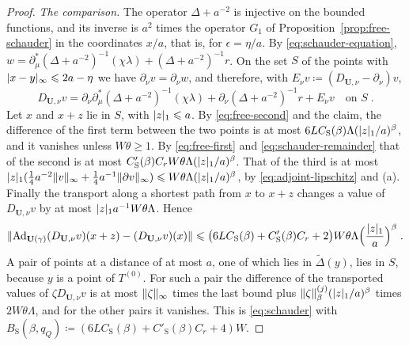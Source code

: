 \documentclass[11pt]{preprint}
\newcommand{\Ad}{\operatorname{Ad}}
\DeclarePairedDelimiter{\abs}{\lvert}{\rvert}
\DeclarePairedDelimiter{\norm}{\lVert}{\rVert}
\numberwithin{equation}{section}
\begin{document}
\begin{proof}
\emph{The comparison.} The operator $\Delta + a^{-2}$ is injective on the bounded functions, and its inverse is $a^2$ times the operator $G_1$ of Proposition~\ref{prop:free-schauder} in the coordinates $x/a$, that is, for $\epsilon = \eta/a$. By \eqref{eq:schauder-equation}, $w = \partial^*_\mu(\Delta + a^{-2})^{-1}(\chi\lambda) + (\Delta + a^{-2})^{-1}r$. On the set $S$ of the points with $\abs{x - y}_\infty \leqslant 2a - \eta$ we have $\partial_\nu v = \partial_\nu w$, and therefore, with $E_\nu v \coloneqq (D_{\mathbf U,\nu} - \partial_\nu)v$,
\[
    D_{\mathbf U,\nu}v = \partial_\nu\partial^*_\mu(\Delta + a^{-2})^{-1}(\chi\lambda) + \partial_\nu(\Delta + a^{-2})^{-1}r + E_\nu v \quad\text{on } S\;.
\]
Let $x$ and $x + z$ lie in $S$, with $\abs z_1 \leqslant a$. By \eqref{eq:free-second} and the claim, the difference of the first term between the two points is at most $6LC_{\mathrm S}(\beta)\Lambda(\abs z_1/a)^\beta$, and it vanishes unless $W\theta \geqslant 1$. By \eqref{eq:free-first} and \eqref{eq:schauder-remainder} that of the second is at most $C'_{\mathrm S}(\beta)C_rW\theta\Lambda(\abs z_1/a)^\beta$. That of the third is at most $\abs z_1(\frac{1}{4}a^{-2}\norm v_\infty + \frac{1}{4}a^{-1}\norm{\partial v}_\infty) \leqslant W\theta\Lambda(\abs z_1/a)^\beta$, by \eqref{eq:adjoint-lipschitz} and (a). Finally the transport along a shortest path from $x$ to $x + z$ changes a value of $D_{\mathbf U,\nu}v$ by at most $\abs z_1a^{-1}W\theta\Lambda$. Hence
\[
    \norm{\Ad_{\mathbf U(\gamma)}(D_{\mathbf U,\nu}v)(x + z) - (D_{\mathbf U,\nu}v)(x)} \leqslant \bigl(6LC_{\mathrm S}(\beta) + C'_{\mathrm S}(\beta)C_r + 2\bigr)W\theta\Lambda\Bigl(\frac{\abs z_1}{a}\Bigr)^\beta\;.
\]
A pair of points at a distance of at most $a$, one of which lies in $\tilde\Delta(y)$, lies in $S$, because $y$ is a point of $T^{(0)}$. For such a pair the difference of the transported values of $\zeta D_{\mathbf U,\nu}v$ is at most $\norm\zeta_\infty$ times the last bound plus $\norm\zeta^{(j)}_\beta(\abs z_1/a)^\beta$ times $2W\theta\Lambda$, and for the other pairs it vanishes. This is \eqref{eq:schauder} with $B_{\mathrm S}(\beta, q_Q) \coloneqq (6LC_{\mathrm S}(\beta) + C'_{\mathrm S}(\beta)C_r + 4)W$.
\end{proof}
\end{document}
